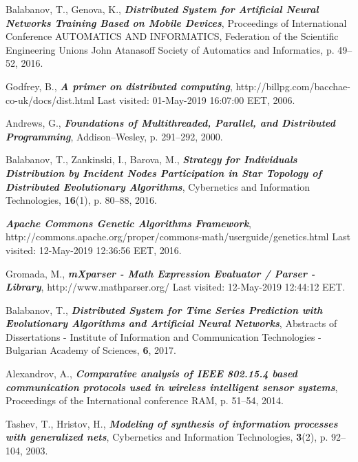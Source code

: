 \documentclass[graybox]{svmult}
\begin{document}
\begin{thebibliography}{99}
 Balabanov, T., Genova, K., \textbf{\textit{Distributed System for Artificial Neural Networks Training Based on Mobile Devices}}, Proceedings of International Conference AUTOMATICS AND INFORMATICS, Federation of the Scientific Engineering Unions John Atanasoff Society of Automatics and Informatics, p. 49--52, 2016.

 Godfrey, B., \textbf{\textit{A primer on distributed computing}}, http://billpg.com/bacchae-co-uk/docs/dist.html Last visited: 01-May-2019 16:07:00 EET, 2006.

 Andrews, G., \textbf{\textit{Foundations of Multithreaded, Parallel, and Distributed Programming}}, Addison–Wesley, p. 291--292, 2000.

 Balabanov, T., Zankinski, I., Barova, M., \textbf{\textit{Strategy for Individuals Distribution by Incident Nodes Participation in Star Topology of Distributed Evolutionary Algorithms}}, Cybernetics and Information Technologies, \textbf{16}(1), p. 80--88, 2016.

 \textbf{\textit{Apache Commons Genetic Algorithms Framework}}, http://commons.apache.org/proper/commons-math/userguide/genetics.html Last visited: 12-May-2019 12:36:56 EET, 2016.

 Gromada, M., \textbf{\textit{mXparser - Math Expression Evaluator / Parser - Library}}, http://www.mathparser.org/ Last visited: 12-May-2019 12:44:12 EET.

 Balabanov, T., \textbf{\textit{Distributed System for Time Series Prediction with Evolutionary Algorithms and Artificial Neural Networks}}, Abstracts of Dissertations - Institute of Information and Communication Technologies - Bulgarian Academy of Sciences, \textbf{6}, 2017.

 Alexandrov, A., \textbf{\textit{Comparative analysis of IEEE 802.15.4 based communication protocols used in wireless intelligent sensor systems}}, Proceedings of the International conference RAM, p. 51--54, 2014.

 Tashev, T., Hristov, H., \textbf{\textit{Modeling of synthesis of information processes with generalized nets}}, Cybernetics and Information Technologies, \textbf{3}(2), p. 92--104, 2003.

\end{thebibliography}
\end{document}
